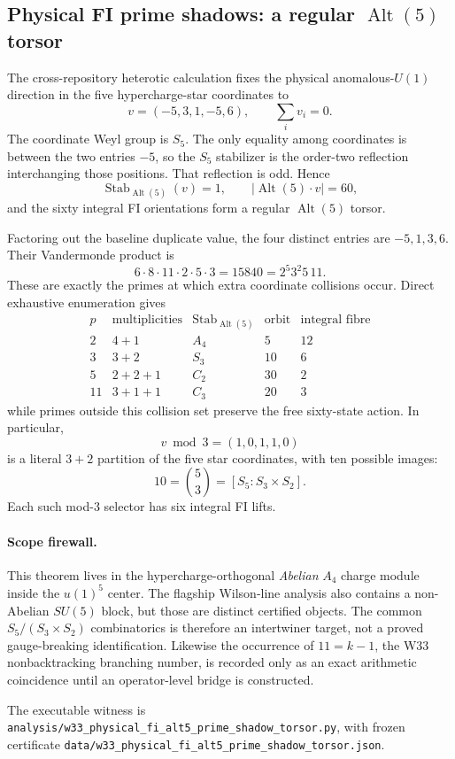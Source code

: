 \subsection*{Physical FI prime shadows: a regular $\operatorname{Alt}(5)$ torsor}

The cross-repository heterotic calculation fixes the physical anomalous-$U(1)$
direction in the five hypercharge-star coordinates to
\[
v=(-5,3,1,-5,6),\qquad \sum_i v_i=0.
\]
The coordinate Weyl group is $S_5$.  The only equality among coordinates is
between the two entries $-5$, so the $S_5$ stabilizer is the order-two
reflection interchanging those positions.  That reflection is odd.  Hence
\[
\operatorname{Stab}_{\operatorname{Alt}(5)}(v)=1,
\qquad
|\operatorname{Alt}(5)\cdot v|=60,
\]
and the sixty integral FI orientations form a regular
$\operatorname{Alt}(5)$ torsor.

Factoring out the baseline duplicate value, the four distinct entries are
$-5,1,3,6$.  Their Vandermonde product is
\[
6\cdot8\cdot11\cdot2\cdot5\cdot3
=15840=2^5 3^2 5\,11.
\]
These are exactly the primes at which extra coordinate collisions occur.
Direct exhaustive enumeration gives
\[
\begin{array}{c|c|c|c|c}
p&\text{multiplicities}&\operatorname{Stab}_{\operatorname{Alt}(5)}
&\text{orbit}&\text{integral fibre}\\ \hline
2&4+1&A_4&5&12\\
3&3+2&S_3&10&6\\
5&2+2+1&C_2&30&2\\
11&3+1+1&C_3&20&3
\end{array}
\]
while primes outside this collision set preserve the free sixty-state action.
In particular,
\[
v\bmod3=(1,0,1,1,0)
\]
is a literal $3+2$ partition of the five star coordinates, with ten possible
images:
\[
10=\binom53=[S_5:S_3\times S_2].
\]
Each such mod-$3$ selector has six integral FI lifts.

\paragraph{Scope firewall.}
This theorem lives in the hypercharge-orthogonal \emph{Abelian} $A_4$ charge
module inside the $u(1)^5$ center.  The flagship Wilson-line analysis also
contains a non-Abelian $SU(5)$ block, but those are distinct certified objects.
The common $S_5/(S_3\times S_2)$ combinatorics is therefore an intertwiner
target, not a proved gauge-breaking identification.  Likewise the occurrence
of $11=k-1$, the W33 nonbacktracking branching number, is recorded only as an
exact arithmetic coincidence until an operator-level bridge is constructed.

The executable witness is
\texttt{analysis/w33\_physical\_fi\_alt5\_prime\_shadow\_torsor.py},
with frozen certificate
\texttt{data/w33\_physical\_fi\_alt5\_prime\_shadow\_torsor.json}.

